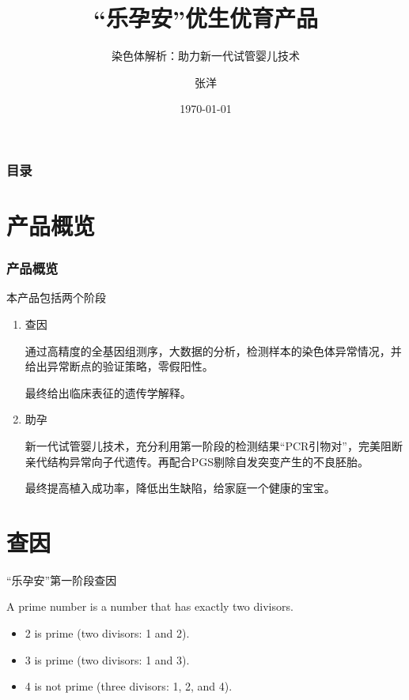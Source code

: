 \documentclass[11pt]{beamer}
\begin{document}
	\author{张洋}
	\title{``乐孕安''优生优育产品}
	\subtitle{染色体解析：助力新一代试管婴儿技术}
	\logo{}
	\date{\today}
	\subject{产品介绍}

\begin{frame}
\titlepage
\end{frame}

\begin{frame}
\frametitle{目\qquad 录}
\tableofcontents
\end{frame}

\section{产品概览}

\begin{frame}
\frametitle{产品概览}
本产品包括两个阶段

\begin{enumerate}
	\item 查因
	
	通过高精度的全基因组测序，大数据的分析，检测样本的染色体异常情况，并给出异常断点的验证策略，零假阳性。
	
	最终给出临床表征的遗传学解释。
	
	\item 助孕
	
	新一代试管婴儿技术，充分利用第一阶段的检测结果“PCR引物对”，完美阻断亲代结构异常向子代遗传。再配合PGS剔除自发突变产生的不良胚胎。
	
	最终提高植入成功率，降低出生缺陷，给家庭一个健康的宝宝。
\end{enumerate}

\end{frame}

\section{查因}

\begin{frame}{``乐孕安''第一阶段}{查因}
\begin{definition}
	A \alert{prime number} is a number that has exactly two divisors.
\end{definition}
\begin{example}
	\begin{itemize}
		\item 2 is prime (two divisors: 1 and 2).
		\pause
		\item 3 is prime (two divisors: 1 and 3).
		\pause
		\item 4 is not prime (\alert{three} divisors: 1, 2, and 4).
	\end{itemize}
\end{example}
\end{frame}
\end{document}
